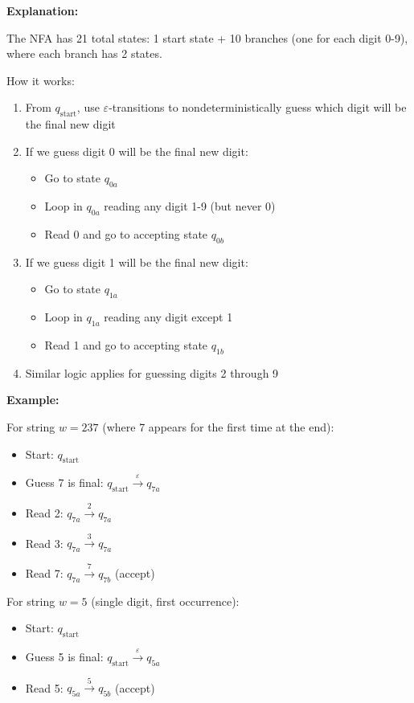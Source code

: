 \documentclass[12pt]{article}
\begin{document}
\textbf{Explanation:}

The NFA has 21 total states: 1 start state + 10 branches (one for each digit 0-9), where each branch has 2 states.

How it works:
\begin{enumerate}
    \item From $q_{\text{start}}$, use $\varepsilon$-transitions to nondeterministically guess which digit will be the final new digit
    \item If we guess digit 0 will be the final new digit:
    \begin{itemize}
        \item Go to state $q_{0a}$
        \item Loop in $q_{0a}$ reading any digit 1-9 (but never 0)
        \item Read 0 and go to accepting state $q_{0b}$
    \end{itemize}
    \item If we guess digit 1 will be the final new digit:
    \begin{itemize}
        \item Go to state $q_{1a}$
        \item Loop in $q_{1a}$ reading any digit except 1
        \item Read 1 and go to accepting state $q_{1b}$
    \end{itemize}
    \item Similar logic applies for guessing digits 2 through 9
\end{enumerate}

\textbf{Example:}

For string $w = 237$ (where 7 appears for the first time at the end):
\begin{itemize}
    \item Start: $q_{\text{start}}$
    \item Guess 7 is final: $q_{\text{start}} \xrightarrow{\varepsilon} q_{7a}$
    \item Read 2: $q_{7a} \xrightarrow{2} q_{7a}$
    \item Read 3: $q_{7a} \xrightarrow{3} q_{7a}$
    \item Read 7: $q_{7a} \xrightarrow{7} q_{7b}$ (accept)
\end{itemize}

For string $w = 5$ (single digit, first occurrence):
\begin{itemize}
    \item Start: $q_{\text{start}}$
    \item Guess 5 is final: $q_{\text{start}} \xrightarrow{\varepsilon} q_{5a}$
    \item Read 5: $q_{5a} \xrightarrow{5} q_{5b}$ (accept)
\end{itemize}
\end{document}
